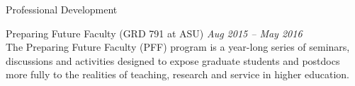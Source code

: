 \begin{rBulletSection}{Professional Development}

    \item Preparing Future Faculty (GRD 791 at ASU) \hfill \emph{Aug 2015 -- May 2016}\\
    The Preparing Future Faculty (PFF) program is a year-long series of seminars, discussions and activities designed to expose graduate students and postdocs more fully to the realities of teaching, research and service in higher education.


\end{rBulletSection}
